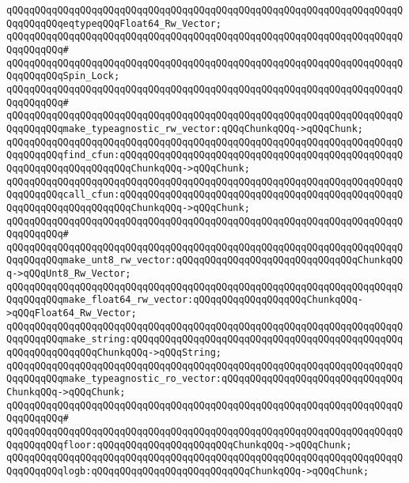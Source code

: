 \verb|qQQqqQQqqQQqqQQqqQQqqQQqqQQqqQQqqQQqqQQqqQQqqQQqqQQqqQQqqQQqqQQqqQQqqQQqqQQqqQQqeqtypeqQQqFloat64_Rw_Vector;|\newline
\verb|qQQqqQQqqQQqqQQqqQQqqQQqqQQqqQQqqQQqqQQqqQQqqQQqqQQqqQQqqQQqqQQqqQQqqQQqqQQqqQQq#|\newline
\verb|qQQqqQQqqQQqqQQqqQQqqQQqqQQqqQQqqQQqqQQqqQQqqQQqqQQqqQQqqQQqqQQqqQQqqQQqqQQqqQQqSpin_Lock;|\newline
\verb|qQQqqQQqqQQqqQQqqQQqqQQqqQQqqQQqqQQqqQQqqQQqqQQqqQQqqQQqqQQqqQQqqQQqqQQqqQQqqQQq#|\newline
\verb|qQQqqQQqqQQqqQQqqQQqqQQqqQQqqQQqqQQqqQQqqQQqqQQqqQQqqQQqqQQqqQQqqQQqqQQqqQQqqQQqmake_typeagnostic_rw_vector:qQQqChunkqQQq->qQQqChunk;|\newline
\verb|qQQqqQQqqQQqqQQqqQQqqQQqqQQqqQQqqQQqqQQqqQQqqQQqqQQqqQQqqQQqqQQqqQQqqQQqqQQqqQQqfind_cfun:qQQqqQQqqQQqqQQqqQQqqQQqqQQqqQQqqQQqqQQqqQQqqQQqqQQqqQQqqQQqqQQqqQQqqQQqChunkqQQq->qQQqChunk;|\newline
\verb|qQQqqQQqqQQqqQQqqQQqqQQqqQQqqQQqqQQqqQQqqQQqqQQqqQQqqQQqqQQqqQQqqQQqqQQqqQQqqQQqcall_cfun:qQQqqQQqqQQqqQQqqQQqqQQqqQQqqQQqqQQqqQQqqQQqqQQqqQQqqQQqqQQqqQQqqQQqqQQqChunkqQQq->qQQqChunk;|\newline
\verb|qQQqqQQqqQQqqQQqqQQqqQQqqQQqqQQqqQQqqQQqqQQqqQQqqQQqqQQqqQQqqQQqqQQqqQQqqQQqqQQq#|\newline
\verb|qQQqqQQqqQQqqQQqqQQqqQQqqQQqqQQqqQQqqQQqqQQqqQQqqQQqqQQqqQQqqQQqqQQqqQQqqQQqqQQqmake_unt8_rw_vector:qQQqqQQqqQQqqQQqqQQqqQQqqQQqqQQqChunkqQQq->qQQqUnt8_Rw_Vector;|\newline
\verb|qQQqqQQqqQQqqQQqqQQqqQQqqQQqqQQqqQQqqQQqqQQqqQQqqQQqqQQqqQQqqQQqqQQqqQQqqQQqqQQqmake_float64_rw_vector:qQQqqQQqqQQqqQQqqQQqChunkqQQq->qQQqFloat64_Rw_Vector;|\newline
\verb|qQQqqQQqqQQqqQQqqQQqqQQqqQQqqQQqqQQqqQQqqQQqqQQqqQQqqQQqqQQqqQQqqQQqqQQqqQQqqQQqmake_string:qQQqqQQqqQQqqQQqqQQqqQQqqQQqqQQqqQQqqQQqqQQqqQQqqQQqqQQqqQQqqQQqChunkqQQq->qQQqString;|\newline
\verb|qQQqqQQqqQQqqQQqqQQqqQQqqQQqqQQqqQQqqQQqqQQqqQQqqQQqqQQqqQQqqQQqqQQqqQQqqQQqqQQqmake_typeagnostic_ro_vector:qQQqqQQqqQQqqQQqqQQqqQQqqQQqqQQqChunkqQQq->qQQqChunk;|\newline
\verb|qQQqqQQqqQQqqQQqqQQqqQQqqQQqqQQqqQQqqQQqqQQqqQQqqQQqqQQqqQQqqQQqqQQqqQQqqQQqqQQq#|\newline
\verb|qQQqqQQqqQQqqQQqqQQqqQQqqQQqqQQqqQQqqQQqqQQqqQQqqQQqqQQqqQQqqQQqqQQqqQQqqQQqqQQqfloor:qQQqqQQqqQQqqQQqqQQqqQQqChunkqQQq->qQQqChunk;|\newline
\verb|qQQqqQQqqQQqqQQqqQQqqQQqqQQqqQQqqQQqqQQqqQQqqQQqqQQqqQQqqQQqqQQqqQQqqQQqqQQqqQQqlogb:qQQqqQQqqQQqqQQqqQQqqQQqqQQqChunkqQQq->qQQqChunk;|\newline
